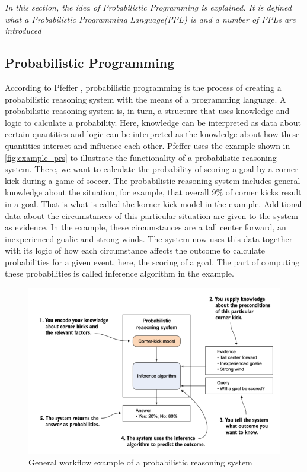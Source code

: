 \documentclass{article}
\begin{document}
\textit{In this section, the idea of Probabilistic Programming is explained. It is defined what a Probabilistic Programming Language(PPL) is and a number of PPLs are introduced}

\subsection{Probabilistic Programming}
According to Pfeffer \cite{9781617292330}, probabilistic programming is the process of creating a probabilistic reasoning system with the means of a programming language. A probabilistic reasoning system is, in turn, a structure that uses knowledge and logic to calculate a probability. Here, knowledge can be interpreted as data about certain quantities and logic can be interpreted as the knowledge about how these quantities interact and influence each other. Pfeffer \cite{9781617292330} uses the example shown in \autoref{fig:example_prs} to illustrate the functionality of a probabilistic reasoning system. There, we want to calculate the probability of scoring a goal by a corner kick during a game of soccer. The probabilistic reasoning system includes general knowledge about the situation, for example, that overall 9\% of corner kicks result in a goal. That is what is called the korner-kick model in the example. Additional data about the circumstances of this particular situation are given to the system as evidence. In the example, these circumstances are a tall center forward, an inexperienced goalie and strong winds. The system now uses this data together with its logic of how each circumstance affects the outcome to calculate probabilities for a given event, here, the scoring of a goal. The part of computing these probabilities is called inference algorithm in the example.
\begin{figure}
	\includegraphics[width=\textwidth]{images/probabilistic_reasoning_system.PNG}
	\caption[General workflow example of a probabilistic reasoning system. Source: \cite{9781617292330}]{General workflow example of a probabilistic reasoning system}
	\label{fig:example_prs}
\end{figure}
\end{document}
